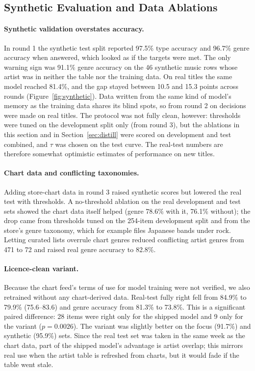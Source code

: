 \documentclass[11pt]{article}
\begin{document}
\subsection{Synthetic Evaluation and Data Ablations}
\label{sec:ablations}

\paragraph{Synthetic validation overstates accuracy.} In round 1 the synthetic test split reported 97.5\% type accuracy and 96.7\% genre accuracy when answered, which looked as if the targets were met. The only warning sign was 91.1\% genre accuracy on the 46 synthetic music rows whose artist was in neither the table nor the training data. On real titles the same model reached 81.4\%, and the gap stayed between 10.5 and 15.3 points across rounds (Figure~\ref{fig:synthetic}). Data written from the same kind of model's memory as the training data shares its blind spots, so from round 2 on decisions were made on real titles. The protocol was not fully clean, however: thresholds were tuned on the development split only (from round 3), but the ablations in this section and in Section~\ref{sec:distill} were scored on development and test combined, and $\tau$ was chosen on the test curve. The real-test numbers are therefore somewhat optimistic estimates of performance on new titles.

\paragraph{Chart data and conflicting taxonomies.} Adding store-chart data in round 3 raised synthetic scores but lowered the real test with thresholds. A no-threshold ablation on the real development and test sets showed the chart data itself helped (genre 78.6\% with it, 76.1\% without); the drop came from thresholds tuned on the 254-item development split and from the store's genre taxonomy, which for example files Japanese bands under rock. Letting curated lists overrule chart genres reduced conflicting artist genres from 471 to 72 and raised real genre accuracy to 82.8\%.

\paragraph{Licence-clean variant.} Because the chart feed's terms of use for model training were not verified, we also retrained without any chart-derived data. Real-test fully right fell from 84.9\% to 79.9\% (75.6--83.6) and genre accuracy from 81.3\% to 73.8\%. This is a significant paired difference: 28 items were right only for the shipped model and 9 only for the variant ($p = 0.0026$). The variant was slightly better on the focus (91.7\%) and synthetic (95.9\%) sets. Since the real test set was taken in the same week as the chart data, part of the shipped model's advantage is artist overlap; this mirrors real use when the artist table is refreshed from charts, but it would fade if the table went stale.
\end{document}
